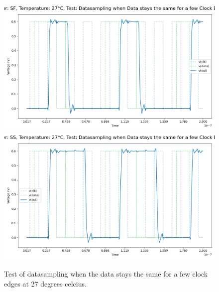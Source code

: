 \begin{figure}[H]
    \vspace{5pt}
    \includegraphics[height= 0.21\textheight]{figures/aimspice/SF/27/W3.csv.png}
    \vspace{5pt}
    \includegraphics[height= 0.21\textheight]{figures/aimspice/SS/27/W3.csv.png}
    \caption{Test of datasampling when the data stays the same for a few clock edges at 27 degrees celcius.}
    \label{fig:aimspice_W3_27}
\end{figure}

\pagebreak

